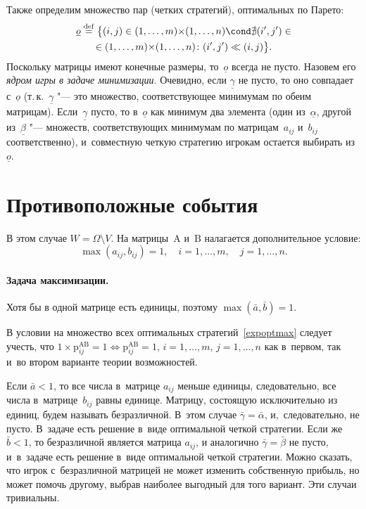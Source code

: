 \documentclass[twoside]{article}
\begin{document}
Также определим множество пар (четких стратегий), оптимальных по Парето:
    \begin{multline}\label{uo}
\underline
o\stackrel{\mathrm{def}}{=}\big\{(i,j)\in(1,\dots,m){\times}(1,\dots,n)\cond\nexists(i',j')\in
    \\
\in(1,\dots,m){\times}(1,\dots,n)\colon (i',j')\ll(i,j)\big\}.
    \end{multline}
Поскольку матрицы имеют конечные размеры, то~$\underline o$ всегда не пусто. Назовем его
\emph{ядром игры в задаче минимизации}. Очевидно, если $\underline\gamma$ не пусто, то оно
совпадает с~$\underline o$ (т.\,к.~$\underline\gamma$ "--- это множество, соответствующее минимумам
по обеим матрицам). Если~$\underline\gamma$ пус\-то, то в~$\underline o$ как минимум два элемента
(один из~$\underline\alpha$, другой из~$\underline\beta$ "--- множеств, соответствующих минимумам
по матрицам~$a_{ij}$ и~$b_{ij}$ соответственно), и~совместную четкую стратегию игрокам остается
выбирать из~$\underline o$.

\section{Противоположные события}
В этом случае $W=\Omega\setminus V$. На матрицы~$\mathrm A$ и~$\mathrm B$ налагается дополнительное
условие:
    \[
\max(a_{ij},b_{ij})=1,\quad i=1,\ldots,m,\quad j=1,\ldots,n.
    \]
\paragraph{Задача максимизации.}
Хотя бы в одной матрице есть единицы, поэтому $\max(\bar a,\bar
b)=1$.

В условии на множество всех оптимальных стратегий~\eqref{expoptmax} следует учесть, что
$1{\times}\mathrm{p}^\mathrm{AB}_{ij}=1\Leftrightarrow\mathrm{p}^\mathrm{AB}_{ij}=1$,\;
$i=1,\ldots,m$,\; $j=1,\ldots,n$ как в~первом, так и~во втором варианте теории возможностей.

Если $\bar a<1$, то все числа в~матрице $a_{ij}$ меньше единицы, следовательно, все числа
в~матрице~$b_{ij}$ равны единице. Матрицу, состоящую исключительно из единиц, будем называть
безразличной. В~этом случае $\bar\gamma=\bar\alpha$, и,~следовательно, не пусто. В~задаче есть
решение в~виде оптимальной четкой стратегии. Если же $\bar b<1$, то безразличной является матрица
$a_{ij}$, и аналогично $\bar\gamma=\bar\beta$ не пусто, и~в~задаче есть решение в~виде оптимальной
четкой стратегии. Можно сказать, что игрок с~безразличной матрицей не может изменить собственную
прибыль, но может помочь другому, выбрав наиболее выгодный для того вариант. Эти случаи тривиальны.
\end{document}
